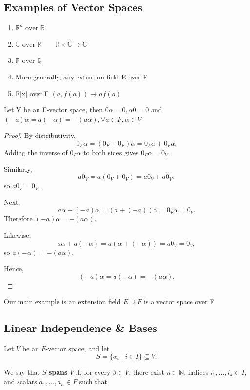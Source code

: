 \documentclass[main.tex]{subfiles}
\begin{document}
\subsection{Examples of Vector Spaces}
\begin{example}\leavevmode\par
    \begin{enumerate}
        \item $\mathbb{R}^n \text{ over } \mathbb{R}$ 
        \item $\mathbb{C} \text{ over } \mathbb{R} \qquad \mathbb{R} \times \mathbb{C} \to \mathbb{C}$
        \item $\mathbb{R} \text{ over } \mathbb{Q}$
        \item More generally, any extension field E over F
        \item F[x] over F $(a,f(a)) \to af(a)$
    \end{enumerate}

\end{example}
\begin{proposition}
    Let V be an F-vector space, then $0 \alpha = 0, \alpha0 = 0$ and $(-a) \alpha = a(-\alpha) = -(a\alpha), \forall a \in F, \alpha \in V$
\end{proposition}
\begin{proof}
    By distributivity,
    \[
        0_F\alpha = (0_F+0_F)\alpha = 0_F\alpha + 0_F\alpha.
    \]
    Adding the inverse of $0_F\alpha$ to both sides gives $0_F\alpha=0_V$.

    Similarly,
    \[
        a0_V = a(0_V+0_V) = a0_V+a0_V,
    \]
    so $a0_V=0_V$.

    Next,
    \[
        a\alpha+(-a)\alpha = (a+(-a))\alpha = 0_F\alpha=0_V.
    \]
    Therefore $(-a)\alpha=-(a\alpha)$.

    Likewise,
    \[
        a\alpha+a(-\alpha) = a(\alpha+(-\alpha))=a0_V=0_V,
    \]
    so $a(-\alpha)=-(a\alpha)$.

    Hence,
    \[
        (-a)\alpha=a(-\alpha)=-(a\alpha).
    \] 
\end{proof}
Our main example is an extension field $E \supseteq F$ is a vector space over F
\subsection{Linear Independence \& Bases}

Let $V$ be an $F$-vector space, and let
\[
    S = \{\alpha_i \mid i \in I\} \subseteq V.
\]

We say that $S$ \textbf{spans} $V$ if, for every $\beta \in V$,
there exist $n \in \mathbb{N}$, indices $i_1,\ldots,i_n \in I$,
and scalars $a_1,\ldots,a_n \in F$ such that
\end{document}
